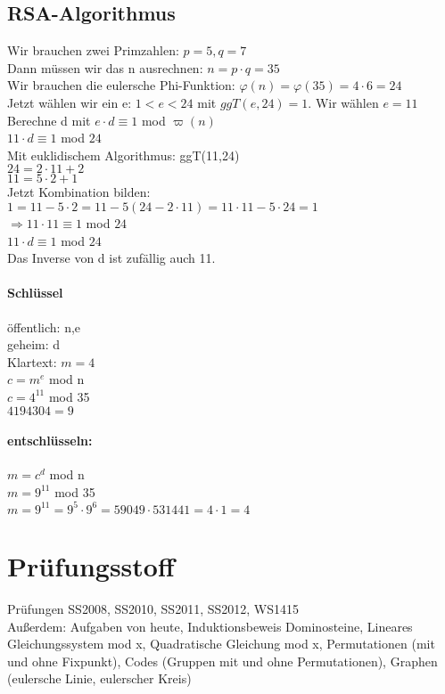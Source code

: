 
\subsection{RSA-Algorithmus}
Wir brauchen zwei Primzahlen: $p=5, q=7$\\
Dann müssen wir das n ausrechnen: $n=p \cdot  q=35$\\
Wir brauchen die eulersche Phi-Funktion: $\varphi(n)=\varphi(35)=4\cdot 6=24$\\
Jetzt wählen wir ein e: $1 < e < 24$ mit $ggT(e,24)=1$. Wir wählen $e=11$\\
Berechne d mit $e \cdot  d \equiv 1$ mod $\varpi(n)$\\
$11 \cdot  d \equiv 1$ mod $24$\\
Mit euklidischem Algorithmus: ggT(11,24)\\
$24=2\cdot 11+2$\\
$11=5\cdot 2+1$\\
Jetzt Kombination bilden: $1=11-5\cdot 2=11-5(24-2\cdot 11)=11\cdot 11-5\cdot 24=1$\\
$\Rightarrow 11\cdot 11\equiv 1$ mod $24$\\
$11\cdot d\equiv1$ mod $24$\\
Das Inverse von d ist zufällig auch 11. 

\paragraph{Schlüssel}
öffentlich: n,e\\
geheim: d\\
Klartext: $m=4$\\
$c=m^e$ mod n\\
$c=4^{11}$ mod 35\\
$4194304=9$

\paragraph{entschlüsseln:}
$m=c^d$ mod n\\
$m=9^{11}$ mod 35\\
$m=9^{11}=9^5\cdot 9^6=59049 \cdot  531441 = 4 \cdot  1 = 4$

\section{Prüfungsstoff}
Prüfungen SS2008, SS2010, SS2011, SS2012, WS1415\\
Außerdem: Aufgaben von heute, Induktionsbeweis Dominosteine, Lineares Gleichungssystem mod x, Quadratische Gleichung mod x, Permutationen (mit und ohne Fixpunkt), Codes (Gruppen mit und ohne  Permutationen), Graphen (eulersche Linie, eulerscher Kreis)
